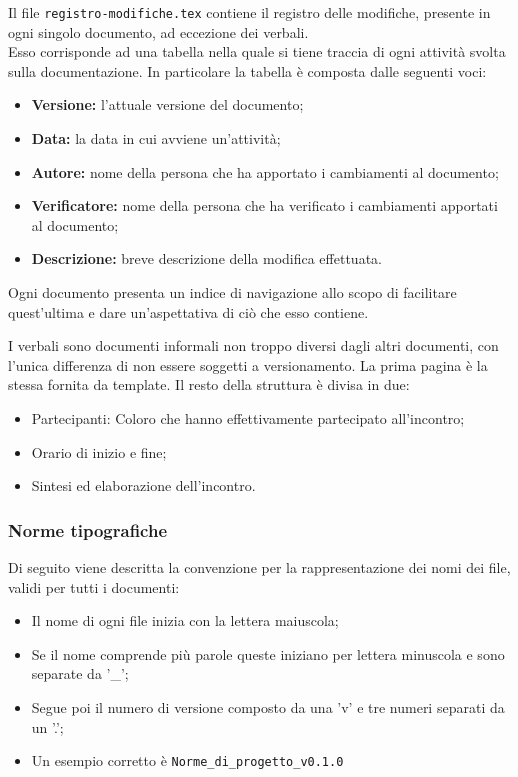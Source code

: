         Il file \texttt{registro-modifiche.tex} contiene il registro delle modifiche, presente in ogni singolo documento, ad eccezione dei verbali. \\
        Esso corrisponde ad una tabella nella quale si tiene traccia di ogni attività svolta sulla documentazione.
        In particolare la tabella è composta dalle seguenti voci:
        \begin{itemize}
          \item \textbf{Versione:} l'attuale versione del documento;
          \item \textbf{Data:} la data in cui avviene un'attività;
          \item \textbf{Autore:} nome della persona che ha apportato i cambiamenti al documento;
          \item \textbf{Verificatore:} nome della persona che ha verificato i cambiamenti apportati al documento;
          \item \textbf{Descrizione:}  breve descrizione della modifica effettuata.
        \end{itemize}

        Ogni documento presenta un indice di navigazione allo scopo di facilitare quest'ultima e
        dare un'aspettativa di ciò che esso contiene.


        I verbali sono documenti informali non troppo diversi dagli altri documenti, con l'unica differenza
        di non essere soggetti a versionamento.
        La prima pagina è la stessa fornita da template.
        Il resto della struttura è divisa in due:
        \begin{itemize}
          \item Partecipanti: Coloro che hanno effettivamente partecipato all'incontro;
          \item Orario di inizio e fine;
          \item Sintesi ed elaborazione dell'incontro.
        \end{itemize}

\subsubsection{Norme tipografiche}

    Di seguito viene descritta la convenzione per la rappresentazione dei nomi dei file, validi per tutti i documenti:
    \begin{itemize}
      \item Il nome di ogni file inizia con la lettera maiuscola;
      \item Se il nome comprende più parole queste iniziano per lettera minuscola e sono separate da '\_';
      \item Segue poi il numero di versione composto da una 'v' e tre numeri separati da un '.';
      \item Un esempio corretto è \texttt{Norme\_di\_progetto\_v0.1.0}
    \end{itemize}
    

